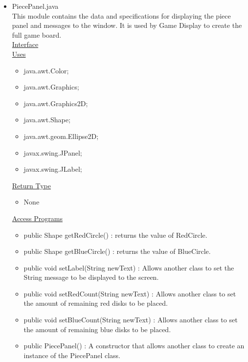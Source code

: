 \documentclass[12pt]{article}
\begin{document}
\begin{itemize}
\begin{itemize}
		\end{itemize}
			\item PiecePanel.java \\
			This module contains the data and specifications for displaying the piece panel and messages to the window. It is used by Game Display to create the full game board. \\
			\underline{Interface} \\
			\underline{Uses}
			\begin{itemize}
				\item java.awt.Color;
				\item java.awt.Graphics;
				\item java.awt.Graphics2D;
				\item java.awt.Shape; 
				\item java.awt.geom.Ellipse2D;
				\item javax.swing.JPanel;
				\item javax.swing.JLabel;
			\end{itemize} 
			\underline{Return Type}
			\begin{itemize}
				\item None
			\end{itemize}
			\underline{Access Programs}
			\begin{itemize}
				\item public Shape getRedCircle() : returns the value of RedCircle.
				\item public Shape getBlueCircle() : returns the value of BlueCircle.
				\item public void setLabel(String newText) : Allows another class to set the String message to be displayed to the screen.
				\item public void setRedCount(String newText) : Allows another class to set the amount of remaining red disks to be placed.
				\item public void setBlueCount(String newText) : Allows another class to set the amount of remaining blue disks to be placed.
				\item public PiecePanel() : A constructor that allows another class to create an instance of the PiecePanel class.
				
			\end{itemize}
			

\end{itemize}
\end{document}

